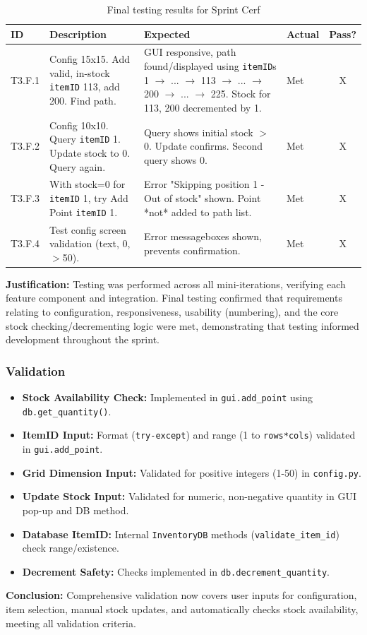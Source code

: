 \begin{table}[htbp] %
	\centering
	\begin{tabularx}{\textwidth}{|l|X|p{4.5cm}|p{1.5cm}|c|}
		\hline
		\textbf{ID} & \textbf{Description} & \textbf{Expected} & \textbf{Actual} & \textbf{Pass?} \\
		\hline
		T3.F.1 & Config 15x15. Add valid, in-stock \verb|itemID| 113, add 200. Find path. & GUI responsive, path found/displayed using \verb|itemID|s 1 $ \rightarrow $ ... $ \rightarrow $ 113 $ \rightarrow $ ... $ \rightarrow $ 200 $ \rightarrow $ ... $ \rightarrow $ 225. Stock for 113, 200 decremented by 1. & Met & X \\
		\hline
		T3.F.2 & Config 10x10. Query \verb|itemID| 1. Update stock to 0. Query again. & Query shows initial stock $>$ 0. Update confirms. Second query shows 0. & Met & X \\
		\hline
		T3.F.3 & With stock=0 for \verb|itemID| 1, try Add Point \verb|itemID| 1. & Error "Skipping position 1 - Out of stock" shown. Point *not* added to path list. & Met & X \\
		\hline
		T3.F.4 & Test config screen validation (text, 0, $>$50). & Error messageboxes shown, prevents confirmation. & Met & X \\
		\hline
	\end{tabularx}
	\caption{Final testing results for Sprint Cerf}
\end{table}

\textbf{Justification:} Testing was performed across all mini-iterations, verifying each feature component and integration. Final testing confirmed that requirements relating to configuration, responsiveness, usability (numbering), and the core stock checking/decrementing logic were met, demonstrating that testing informed development throughout the sprint.

\subsubsection{Validation}
	\begin{itemize}
		\item \textbf{Stock Availability Check:} Implemented in \verb|gui.add_point| using \verb|db.get_quantity()|.
		\item \textbf{ItemID Input:} Format (\verb|try-except|) and range (1 to \verb|rows*cols|) validated in \verb|gui.add_point|.
		\item \textbf{Grid Dimension Input:} Validated for positive integers (1-50) in \verb|config.py|.
		\item \textbf{Update Stock Input:} Validated for numeric, non-negative quantity in GUI pop-up and DB method.
		\item \textbf{Database ItemID:} Internal \verb|InventoryDB| methods (\verb|validate_item_id|) check range/existence.
		\item \textbf{Decrement Safety:} Checks implemented in \verb|db.decrement_quantity|.
	\end{itemize}
	\textbf{Conclusion:} Comprehensive validation now covers user inputs for configuration, item selection, manual stock updates, and automatically checks stock availability, meeting all validation criteria.
	
